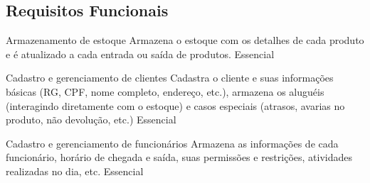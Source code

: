 \documentclass{article}
\begin{document}
  \subsection{Requisitos Funcionais}
    \begin{functional}
     \requirement
      {Armazenamento de estoque}
      {Armazena o estoque com os detalhes de cada produto e é atualizado a cada entrada ou saída de produtos.}
      {Essencial}

     \requirement
      {Cadastro e gerenciamento de clientes}
      {Cadastra o cliente e suas informações básicas (RG, CPF, nome completo, endereço, etc.), armazena os aluguéis (interagindo diretamente com o estoque) e casos especiais (atrasos, avarias no produto, não devolução, etc.)}
      {Essencial}

     \requirement
      {Cadastro e gerenciamento de funcionários}
      {Armazena as informações de cada funcionário, horário de chegada e saída, suas permissões e restrições, atividades realizadas no dia, etc.}
      {Essencial}
    \end{functional}
  
\end{document}
